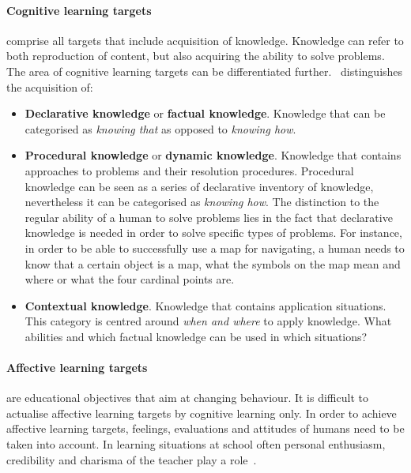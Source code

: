 \paragraph{Cognitive learning targets} comprise all targets that include acquisition 
of knowledge. Knowledge can refer to both reproduction of content, but also 
acquiring the ability to solve problems. The area of cognitive learning targets
can be differentiated further.~ \citeyear{Richert2007} 
distinguishes the acquisition of:
\begin{itemize}
  \item \textbf{Declarative knowledge} or \textbf{factual knowledge}. Knowledge
        that can be categorised as \emph{knowing that} as opposed to 
        \emph{knowing how}.
  \item \textbf{Procedural knowledge} or \textbf{dynamic knowledge}. Knowledge
        that contains approaches to problems and their resolution procedures.
        Procedural knowledge can be seen as a series of declarative inventory
        of knowledge, nevertheless it can be categorised as \emph{knowing how}.
        The distinction to the regular ability of a human to solve problems lies
        in the fact that declarative knowledge is needed in order to solve
        specific types of problems. For instance, in order to be able to 
        successfully use a map for navigating, a human needs to know that a 
        certain object is a map, what the symbols on the map mean and 
        where or what the four cardinal points are.
  \item \textbf{Contextual knowledge}. Knowledge that contains application
        situations. This category is centred around \emph{when and where} to
        apply knowledge. What abilities and which factual knowledge can be
        used in which situations?
\end{itemize}

\paragraph{Affective learning targets} are educational objectives that aim at changing
behaviour. It is difficult to actualise affective learning targets by cognitive
learning only. In order to achieve affective learning targets, feelings, 
evaluations and attitudes of humans need to be taken into account. In learning 
situations at school often personal enthusiasm, credibility and charisma of 
the teacher play a role~.

